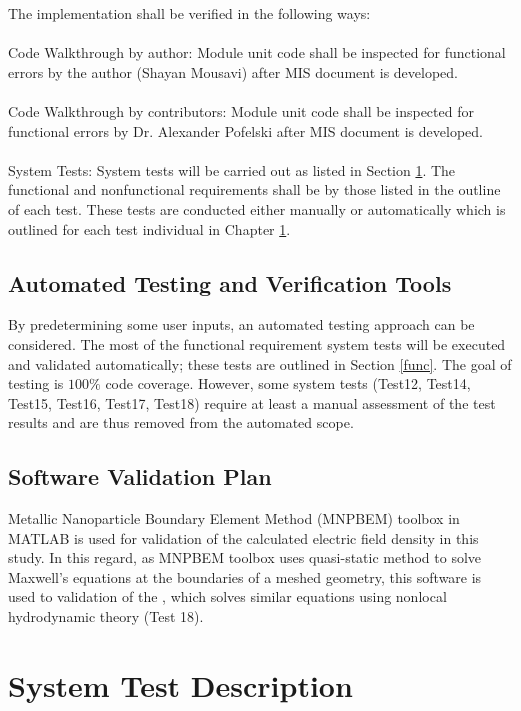 \documentclass[12pt, titlepage]{article}
\begin{document}
The implementation shall be verified in the following ways:\\
\\
Code Walkthrough by author:  Module unit code shall be inspected for functional errors by the author (Shayan Mousavi) after MIS document is developed.\\  
\\
Code Walkthrough by contributors: Module unit code shall be inspected for functional errors by Dr. Alexander Pofelski after MIS document is developed.\\
\\
System Tests:  System tests will be carried out as listed in Section \ref{systest}. The functional and nonfunctional requirements shall be by those listed in the outline of each test. These tests are conducted either manually or automatically which is outlined for each test individual in Chapter \ref{systest}. 

\subsection{Automated Testing and Verification Tools}

By predetermining some user inputs, an automated testing approach can be
considered. The most of the functional requirement system tests will be executed and
validated automatically; these tests are outlined in Section \ref{func}. The goal of testing is $100\%$ code coverage. However, some system tests (Test12, Test14, Test15, Test16, Test17, Test18) require at least a manual assessment of the test results and
are thus removed from the automated scope.
\subsection{Software Validation Plan}
 
Metallic Nanoparticle Boundary Element Method (MNPBEM) toolbox in MATLAB is used for validation of the calculated electric field density in this study. In this regard, as MNPBEM toolbox uses quasi-static method to solve Maxwell's equations at the boundaries of a meshed geometry, this software is used to validation of the \progname{}, which solves similar equations using nonlocal hydrodynamic theory (Test 18).

\section{System Test Description}
\label{systest}
\end{document}
